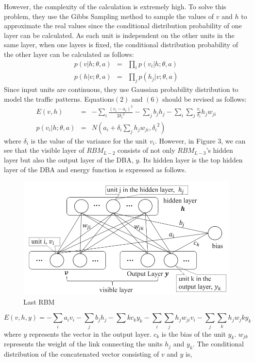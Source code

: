 \documentclass[11pt]{report}
\begin{document}
	However, the complexity of the calculation is extremely high. To solve this problem, they use the Gibbs Sampling method to sample the values of $v$ and $h$ to approximate the real values since the conditional distribution probability of one layer can be calculated. As each unit is independent on the other units in the same layer, when one layers is fixed, the conditional distribution probability of the other layer can be calculated as follows:
	\begin{eqnarray}
	p\left(v|h;\theta,a\right) &=& \prod_{i}p\left(v_i|h;\theta,a\right)\\
	p\left(h|v;\theta,a\right) &=& \prod_{j}p\left(h_j|v;\theta,a\right)
	\end{eqnarray}
	Since input units are continuous, they use Gaussian probability distribution to model the traffic patterns. Equations$\left(2\right)$ and $\left(6\right)$ should be revised as follows:
	\begin{eqnarray}
	E\left(v,h\right) &=& -\sum_{i}\frac{\left(v_i-a_i\right)^2}{2{\delta_i}^2}-\sum_{j}b_jh_j-\sum_{i}\sum_{j}\frac{v_i}{\delta_i}h_jw_{ji}\\
	p\left(v_i|h;\theta,a\right) &=& N\left(a_i+\delta_i\sum_{j}h_jw_{ji},{\delta_i}^2\right)	
	\end{eqnarray}
	where $\delta_i$ is the value of the variance for the unit $v_i$. 
	However, in Figure 3, we can see that the visible layer of $RBM_{L-2}$ consists of not only $RBM_{L-3}$'s hidden layer but also the output layer of the DBA, $y$. Its hidden layer is the top hidden layer of the DBA and energy function is expressed as follows.
	\begin{figure}[h!]
		\centering
		\includegraphics[width=0.5\linewidth]{figure3.png}
		\caption{Last RBM}
		\label{fig-label}
	\end{figure}
	\begin{equation}
	E\left(v,h,y\right) = -\sum_{i}a_iv_i-\sum_{j}b_jh_j-\sum{k}c_ky_k-\sum_{i}\sum_{j}h_jw_{ji}v_i-\sum_{j}\sum_{k}h_jw_jky_k
	\end{equation}
	where $y$ represents the vector in the output layer. $c_k$ is the bias of the unit $y_k$. $w_{jk}$ represents the weight of the link connecting the units $h_j$ and $y_k$. The conditional distribution of the concatenated vector consisting of $v$ and $y$ is,
\end{document}
